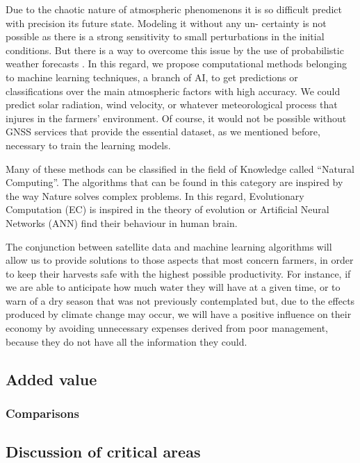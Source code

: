Due to the chaotic nature of atmospheric phenomenons it is so difficult predict with precision its future state. Modeling it without any un- certainty is not possible as there is a strong sensitivity to small perturbations in the initial conditions. But there is a way to overcome this issue by the use of probabilistic weather forecasts \cite{martinez2015forecasting}. In this regard, we propose computational methods belonging to machine learning techniques, a branch of AI, to get predictions or classifications over the main atmospheric factors with high accuracy. We could predict solar radiation, wind velocity, or whatever meteorological process that injures in the farmers' environment. Of course, it would not be possible without GNSS services that provide the essential dataset, as we mentioned before, necessary to train the learning models.

Many of these methods can be classified in the field of Knowledge called “Natural Computing”. The algorithms that can be found in this category are inspired by the way Nature solves complex problems. In this regard, Evolutionary Computation (EC) is inspired in the theory of evolution or Artificial Neural Networks (ANN) find their behaviour in human brain.

The conjunction between satellite data and machine learning algorithms will allow us to provide solutions to those aspects that most concern farmers, in order to keep their harvests safe with the highest possible productivity. For instance, if we are able to anticipate how much water they will have at a given time, or to warn of a dry season that was not previously contemplated but, due to the effects produced by climate change may occur, we will have a positive influence on their economy by avoiding unnecessary expenses derived from poor management, because they do not have all the information they could.

\subsection{Added value}
\subsubsection{Comparisons}	
\subsection{Discussion of critical areas}

